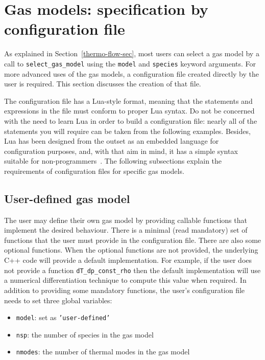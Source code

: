 \section{Gas models: specification by configuration file}
\label{app:gas-models}
As explained in Section~\ref{thermo-flow-sec}, most users
can select a gas model by a call to \texttt{select\_gas\_model}
using the \texttt{model} and \texttt{species} keyword arguments.
For more advanced uses of the gas models, a configuration file
created directly by the user is required.
This section discusses the creation of that file.

The configuration file has a Lua-style format, meaning
that the statements and expressions in the file must conform
to proper Lua syntax.
Do not be concerned with the need to learn Lua in order to
build a configuration file: nearly all of the statements
you will require can be taken from the following examples.
Besides, Lua has been designed from the outset as an embedded
language for configuration purposes, and, with that aim in mind,
it has a simple syntax suitable for non-programmers~\cite{ierusalimschy_etal_1996}.
The following subsections explain the requirements of configuration
files for specific gas models.

\subsection{User-defined gas model}
The user may define their own gas model by providing
callable functions that implement the desired behaviour.
There is a minimal (read mandatory) set of functions
that the user must provide in the configuration file.
There are also some optional functions.
When the optional functions are not provided, the
underlying C++ code will provide a default implementation.
For example, if the user does not provide a function \texttt{dT\_dp\_const\_rho}
then the default implementation will use a numerical differentiation
technique to compute this value when required.
In addition to providing some mandatory functions, the user's
configuration file needs to set three global variables:
\begin{itemize}
 \item \texttt{model}: set as \texttt{'user-defined'}
 \item \texttt{nsp}: the number of species in the gas model
 \item \texttt{nmodes}: the number of thermal modes in the gas model
\end{itemize}

